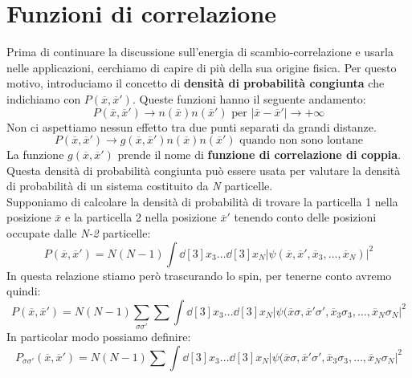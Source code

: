 \section{Funzioni di correlazione}
Prima di continuare la discussione sull'energia di scambio-correlazione e usarla nelle applicazioni, cerchiamo di capire di più della sua origine fisica. Per questo motivo, introduciamo il concetto di \textbf{densità di probabilità congiunta} che indichiamo con $P(\overline x, \overline{x}')$. Queste funzioni hanno il seguente andamento:
\begin{equation*}
    P(\overline x, \overline x') \longrightarrow n(\overline x)n(\overline{x}') \text{ per } |\overline x-\overline{x}'|\rightarrow +\infty
\end{equation*}
Non ci aspettiamo nessun effetto tra due punti separati da grandi distanze.
\begin{equation*}
    P(\overline x, \overline x') \longrightarrow g(\overline x, \overline x')n(\overline x)n(\overline{x}') \text{ quando non sono lontane}
\end{equation*}
La funzione $g(\overline x, \overline x')$ prende il nome di \textbf{funzione di correlazione di coppia}. \\
Questa densità di probabilità congiunta può essere usata per valutare la densità di probabilità di un sistema costituito da \textit{N} particelle.\\
Supponiamo di calcolare la densità di probabilità di trovare la particella 1 nella posizione $\overline x$ e la particella 2 nella posizione $\overline{x}'$ tenendo conto delle posizioni occupate dalle \textit{N-2} particelle:
\begin{equation*}
    P(\overline x, \overline{x}')=N(N-1)\int \dd[3]x_3\dots\dd[3]{x_N} |\psi(\overline x, \overline{x}', \overline{x}_3, \dots, \overline{x}_N)|^2
\end{equation*}
In questa relazione stiamo però trascurando lo spin, per tenerne conto avremo quindi:
\begin{equation*}
    P(\overline x, \overline{x}')=N(N-1)\sum_{\sigma \sigma'}\sum_{}\int \dd[3]{x_3}\dots\dd[3]{x_N}|\psi(\overline x \sigma, \overline{x}'\sigma', \overline{x}_3\sigma_3,\dots,\overline{x}_N\sigma_N|^2
\end{equation*}
In particolar modo possiamo definire:
\begin{equation*}
    P_{\sigma\sigma'}(\overline x, \overline{x}')=N(N-1)\sum_{}\int \dd[3]{x_3}\dots\dd[3]{x_N}|\psi(\overline x \sigma, \overline{x}'\sigma', \overline{x}_3\sigma_3,\dots,\overline{x}_N\sigma_N|^2
\end{equation*}
